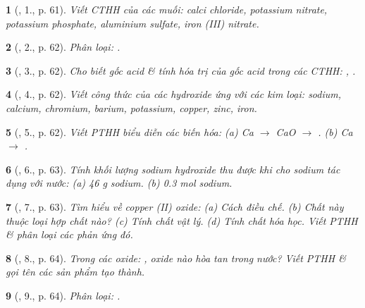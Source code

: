 \documentclass{article}
\newtheorem{baitoan}{}
\begin{document}
\begin{baitoan}[\cite{An_Hoa_Hoc_nang_cao_8_9}, 1., p. 61]
	Viết CTHH của các muối: calci chloride, potassium nitrate, potassium phosphate, aluminium sulfate, iron (III) nitrate.
\end{baitoan}

\begin{baitoan}[\cite{An_Hoa_Hoc_nang_cao_8_9}, 2., p. 62]
	Phân loại: {\rm{}}.
\end{baitoan}

\begin{baitoan}[\cite{An_Hoa_Hoc_nang_cao_8_9}, 3., p. 62]
	Cho biết gốc acid \& tính hóa trị của gốc acid trong các CTHH: {\rm{}, }.
\end{baitoan}

\begin{baitoan}[\cite{An_Hoa_Hoc_nang_cao_8_9}, 4., p. 62]
	Viết công thức của các hydroxide ứng với các kim loại: sodium, calcium, chromium, barium, potassium, copper, zinc, iron.
\end{baitoan}

\begin{baitoan}[\cite{An_Hoa_Hoc_nang_cao_8_9}, 5., p. 62]
	Viết PTHH biểu diễn các biến hóa: (a) {\rm Ca $\to$ CaO $\to$ }. (b) {\rm Ca $\to$ }.
\end{baitoan}

\begin{baitoan}[\cite{An_Hoa_Hoc_nang_cao_8_9}, 6., p. 63]
	Tính khối lượng sodium hydroxide thu được khi cho sodium tác dụng với nước: (a) {\rm46 g} sodium. (b) {0.3 mol} sodium.
\end{baitoan}

\begin{baitoan}[\cite{An_Hoa_Hoc_nang_cao_8_9}, 7., p. 63]
	Tìm hiểu về copper (II) oxide: (a) Cách điều chế. (b) Chất này thuộc loại hợp chất nào? (c) Tính chất vật lý. (d) Tính chất hóa học. Viết PTHH \& phân loại các phản ứng đó.
\end{baitoan}

\begin{baitoan}[\cite{An_Hoa_Hoc_nang_cao_8_9}, 8., p. 64]
	Trong các oxide: {\rm{}}, oxide nào hòa tan trong nước? Viết PTHH \& gọi tên các sản phẩm tạo thành.
\end{baitoan}

\begin{baitoan}[\cite{An_Hoa_Hoc_nang_cao_8_9}, 9., p. 64]
	Phân loại: {\rm{}}.
\end{baitoan}
\end{document}
